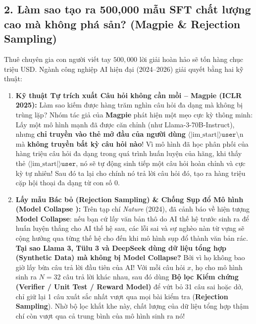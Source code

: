 \subsection{2. Làm sao tạo ra 500,000 mẫu SFT chất lượng cao mà không phá sản? (Magpie \& Rejection Sampling)}
Thuê chuyên gia con người viết tay $500,000$ lời giải hoàn hảo sẽ tốn hàng chục triệu USD. Ngành công nghiệp AI hiện đại (2024--2026) giải quyết bằng hai kỹ thuật:
\begin{enumerate}[leftmargin=1.2cm]
    \item \textbf{Kỹ thuật Tự trích xuất Câu hỏi không cần mồi -- Magpie \citep{xu2025magpie} (ICLR 2025):}
    Làm sao kiếm được hàng trăm nghìn câu hỏi đa dạng mà không bị trùng lặp? Nhóm tác giả của \textbf{Magpie} phát hiện một mẹo cực kỳ thông minh: Lấy một mô hình mạnh đã được căn chỉnh (như Llama-3-70B-Instruct), nhưng \textbf{chỉ truyền vào thẻ mở đầu của người dùng} $\langle|\text{im\_start}|\rangle\texttt{user}\text{\textbackslash n}$ mà \textbf{không truyền bất kỳ câu hỏi nào}!
    Vì mô hình đã học phân phối của hàng triệu câu hỏi đa dạng trong quá trình huấn luyện của hãng, khi thấy thẻ $\langle|\text{im\_start}|\rangle\texttt{user}$, nó sẽ tự động sinh tiếp một câu hỏi hoàn chỉnh và cực kỳ tự nhiên! Sau đó ta lại cho chính nó trả lời câu hỏi đó, tạo ra hàng triệu cặp hội thoại đa dạng từ con số 0.
    \item \textbf{Lấy mẫu Bác bỏ (Rejection Sampling) \& Chống Sụp đổ Mô hình (Model Collapse \citealt{shumailov2024ai}):}
    Trên tạp chí \textit{Nature} (2024), \citet{shumailov2024ai} đã cảnh báo về hiện tượng \textbf{Model Collapse}: nếu bạn cứ lấy văn bản thô do AI thế hệ trước sinh ra để huấn luyện thẳng cho AI thế hệ sau, các lỗi sai và sự nghèo nàn từ vựng sẽ cộng hưởng qua từng thế hệ cho đến khi mô hình sụp đổ thành văn bản rác.
    \textbf{Tại sao Llama 3, Tülu 3 và DeepSeek dùng dữ liệu tổng hợp (Synthetic Data) mà không bị Model Collapse?}
    Bởi vì họ không bao giờ lấy bừa câu trả lời đầu tiên của AI! Với mỗi câu hỏi $x$, họ cho mô hình sinh ra $N = 32$ câu trả lời khác nhau, sau đó dùng \textbf{Bộ lọc Kiểm chứng (Verifier / Unit Test / Reward Model)} để vứt bỏ 31 câu sai hoặc dở, chỉ giữ lại 1 câu xuất sắc nhất vượt qua mọi bài kiểm tra (\textbf{Rejection Sampling}). Nhờ bộ lọc khắt khe này, chất lượng của dữ liệu tổng hợp thậm chí còn vượt qua cả trung bình của mô hình sinh ra nó!
\end{enumerate}


